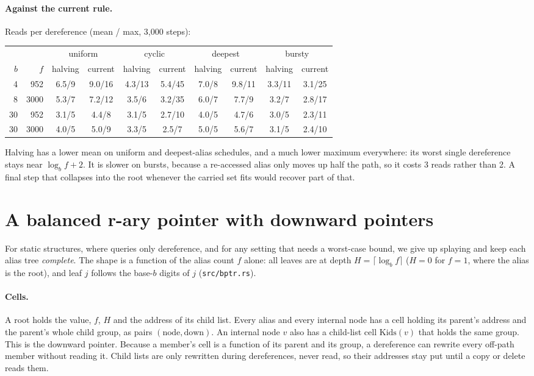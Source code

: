 \documentclass[11pt]{article}
\theoremstyle{definition}
\begin{document}
\paragraph{Against the current rule.} Reads per dereference (mean / max,
3{,}000 steps):
\begin{center}\small
\begin{tabular}{rr|cc|cc|cc|cc}
&&\multicolumn{2}{c|}{uniform}&\multicolumn{2}{c|}{cyclic}&\multicolumn{2}{c|}{deepest}&\multicolumn{2}{c}{bursty}\\
$b$&$f$&halving&current&halving&current&halving&current&halving&current\\\hline
4&952&6.5/9&9.0/16&4.3/13&5.4/45&7.0/8&9.8/11&3.3/11&3.1/25\\
8&3000&5.3/7&7.2/12&3.5/6&3.2/35&6.0/7&7.7/9&3.2/7&2.8/17\\
30&952&3.1/5&4.4/8&3.1/5&2.7/10&4.0/5&4.7/6&3.0/5&2.3/11\\
30&3000&4.0/5&5.0/9&3.3/5&2.5/7&5.0/5&5.6/7&3.1/5&2.4/10
\end{tabular}
\end{center}
Halving has a lower mean on uniform and deepest-alias schedules, and a much
lower maximum everywhere: its worst single dereference stays near
$\log_b f+2$. It is slower on bursts, because a re-accessed alias only moves
up half the path, so it costs 3 reads rather than 2. A final step that
collapses into the root whenever the carried set fits would recover part of
that.

\section{A balanced r-ary pointer with downward pointers}
\label{sec:balanced}

For static structures, where queries only dereference, and for any setting
that needs a worst-case bound, we give up splaying and keep each alias tree
\emph{complete}. The shape is a function of the alias count $f$ alone: all
leaves are at depth $H=\lceil\log_b f\rceil$ ($H=0$ for $f=1$, where the alias
is the root), and leaf $j$ follows the base-$b$ digits of $j$
(\texttt{src/bptr.rs}).

\paragraph{Cells.} A root holds the value, $f$, $H$ and the address of its
child list. Every alias and every internal node has a cell holding its
parent's address and the parent's whole child group, as pairs
$(\text{node},\text{down})$. An internal node $v$ also has a child-list cell
$\mathrm{Kids}(v)$ that holds the same group. This is the downward pointer.
Because a member's cell is a function of its parent and its group, a
dereference can rewrite every off-path member without reading it. Child lists
are only rewritten during dereferences, never read, so their addresses stay
put until a copy or delete reads them.
\end{document}
